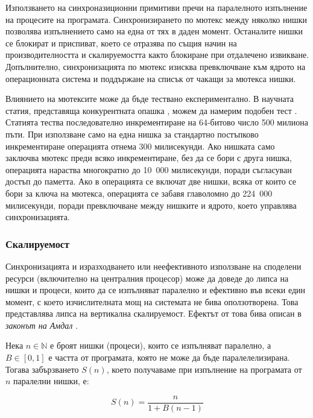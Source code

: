 Използването на синхроназиционни примитиви пречи на паралелното изпълнение на процесите на програмата. Синхронизирането по мютекс между няколко нишки позволява изпълнението само на една от тях в даден момент. Останалите нишки се блокират и приспиват, което се отразява по същия начин на производителността и скалируемостта както блокиране при отдалечено извикване. Допълнително, синхронизацията по мютекс изисква превключване към ядрото на операционната система и поддържане на списък от чакащи за мютекса нишки.

Влиянието на мютексите може да бъде тествано експериментално. В научната статия, представяща конкурентната опашка , можем да намерим подобен тест \cite{thompson2011Disruptor}. Статията тества последователно инкрементиране на 64-битово число 500 милиона пъти. При използване само на една нишка за стандартно постъпково инкрементиране операцията отнема 300 милисекунди. Ако нишката само заключва мютекс преди всяко инкрементиране, без да се бори с друга нишка, операцията нараства многократно до 10~000 милисекунди, поради съгласуван достъп до паметта. Ако в операцията се включат две нишки, всяка от които се бори за ключа на мютекса, операцията се забавя главоломно до 224~000 милисекунди, поради превключване между нишките и ядрото, което управлява синхронизацията.

\subsubsection{Скалируемост}

Синхронизацията и изразходването или неефективното използване на споделени ресурси (включително на централния процесор) може да доведе до липса на нишки и процеси, които да се изпълняват паралелно и ефективно във всеки един момент, с което изчислителната мощ на системата не бива оползотворена. Това представлява липса на вертикална скалируемост. Ефектът от това бива описан в \emph{законът на Амдал} \cite{amdahl1967Law}.

Нека $n \in \mathbb{N}$ е броят нишки (процеси), които се изпълняват паралелно, а $B \in [0, 1]$ е частта от програмата, която не може да бъде паралелелизирана. Тогава забързването $S(n)$, което получаваме при изпълнение на програмата от $n$ паралелни нишки, е:

\begin{equation}
  S(n) = \frac{n}{1 + B(n - 1)}
\end{equation}

